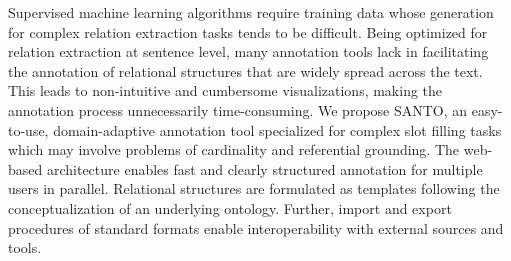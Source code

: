 Supervised machine learning algorithms require training data whose generation for complex relation extraction tasks tends to be difficult. Being optimized for relation extraction at sentence level, many annotation tools lack in facilitating the annotation of relational structures that are widely spread across the text. This leads to non-intuitive and cumbersome visualizations, making the annotation process unnecessarily time-consuming. We propose SANTO, an easy-to-use, domain-adaptive annotation tool specialized for complex slot filling tasks which may involve problems of cardinality and referential grounding. The web-based  architecture enables fast and clearly structured annotation for multiple users in parallel. Relational structures are formulated as templates following the conceptualization of an underlying ontology. Further, import and export procedures of standard formats enable interoperability with external sources and tools.
